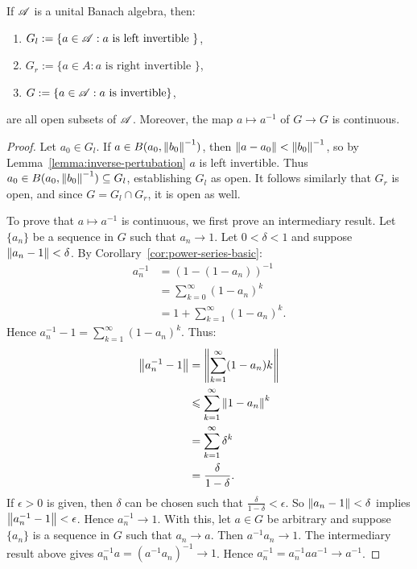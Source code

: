 \begin{theorem}
	If $\mathscr{A}$ is a unital Banach algebra, then:
	\mbox{}
	\begin{enumerate}[label = (\roman*),itemsep=1pt,topsep=3pt]
		\item $G_l := \{a \in \mathscr{A} : a \text{ is left invertible }\}$,
		\item $G_r := \{a \in A: a \text{ is right invertible }\}$,
		\item $G := \{a \in \mathscr{A} : a \text{ is invertible}\}$,
	\end{enumerate}
	are all open subsets of $\mathscr{A}$. Moreover, the map $a \mapsto a ^{-1}$ of $G \rightarrow G$ is continuous.
\end{theorem}
	\begin{proof}
		Let $a_0 \in G_l$. If $a \in B(a_0, \left\lVert b_0 \right\rVert^{-1})$, then $\left\lVert a-a_0 \right\rVert < \left\lVert b_0 \right\rVert^{-1}$, so by Lemma~\ref{lemma:inverse-pertubation} $a$ is left invertible. Thus $a_0 \in B(a_0,\left\lVert b_0 \right\rVert^{-1}) \subseteq G_l$, establishing $G_l$ as open. It follows similarly that $G_r$ is open, and since $G = G_l \cap G_r$, it is open as well. 

		To prove that $a \mapsto a^{-1}$ is continuous, we first prove an intermediary result. Let $\{a_n\}$ be a sequence in $G$ such that $a_n \rightarrow 1$. Let $0 < \delta <1$ and suppose $\left\lVert a_n - 1 \right\rVert < \delta$. By Corollary~\ref{cor:power-series-basic}:
		\begin{align*}
			a_n^{-1}
			&= (1-(1-a_n))^{-1} \\
			&= \sum_{k=0}^{\infty} (1-a_n)^k \\
			&= 1+ \sum_{k=1}^{\infty} (1-a_n)^k.
		\end{align*}
		Hence $a_n^{-1} - 1 = \sum_{k=1}^{\infty} (1-a_n)^k$. Thus:
		\begin{align*}
			\left\lVert a_n^{-1} - 1 \right\rVert
			&= \left\lVert \sum_{k=1}^{\infty} (1-a_n)k \right\rVert \\
			&\leqslant \sum_{k=1}^{\infty} \left\lVert 1-a_n \right\rVert^k \\
			&= \sum_{k=1}^{\infty} \delta^k \\
			&= \frac{\delta}{1-\delta}. 
		\end{align*}
		If $\epsilon > 0$ is given, then $\delta$ can be chosen such that $\frac{\delta}{1-\delta} < \epsilon$. So $\left\lVert a_n - 1 \right\rVert < \delta$ implies $\left\lVert a_n^{-1} - 1 \right\rVert < \epsilon$. Hence $a_n^{-1} \rightarrow 1$.
		With this, let $a \in G$ be arbitrary and suppose $\{a_n\}$ is a sequence in $G$ such that $a_n \rightarrow a$. Then $a^{-1}a_n \rightarrow 1$. The intermediary result above gives $a_n^{-1}a = (a^{-1}a_n)^{-1} \rightarrow 1$. Hence $a_n^{-1} = a_n^{-1}aa^{-1} \rightarrow a^{-1}$.
	\end{proof}

